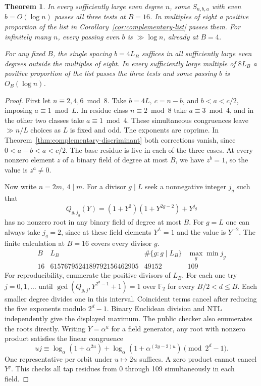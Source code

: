 \documentclass[11pt]{article}
\newtheorem{theorem}{Theorem}
\newcommand{\F}{\mathbb F_2}
\begin{document}
\begin{theorem}\label{thm:complementary-local}
In every sufficiently large even degree \(n\), some \(S_{n,b,a}\)
with even \(b=O(\log n)\) passes all three tests at \(B=16\).
In multiples of eight a positive proportion of the list in
Corollary~\ref{cor:complementary-list} passes them.
For infinitely many \(n\), every passing even \(b\) is
\(\gg\log n\), already at \(B=4\).

For any fixed \(B\), the single spacing \(b=4L_B\) suffices in all
sufficiently large even degrees outside the multiples of eight.
In every sufficiently large multiple of \(8L_B\) a positive proportion
of the list passes the three tests and some passing \(b\) is \(O_B(\log n)\).
\end{theorem}
\begin{proof}
First let \(n\equiv2,4,6\bmod8\). Take \(b=4L,\ c=n-b\), and
\(b<a<c/2\), imposing \(a\equiv1\bmod L\). In residue class
\(n\equiv2\bmod8\) take \(a\equiv3\bmod4\), and in the other two
classes take \(a\equiv1\bmod4\). These simultaneous congruences
leave \(\gg n/L\) choices as \(L\) is fixed and odd. The exponents
are coprime. In Theorem~\ref{thm:complementary-discriminant} both
corrections vanish, since \(0<a-b<a<c/2\). The base residue is
five in each of the three cases. At every nonzero element \(z\) of
a binary field of degree at most \(B\), we have \(z^b=1\), so the
value is \(z^a\ne0\).

Now write \(n=2m,\ 4\mid m\). For a divisor \(g\mid L\) seek
a nonnegative integer \(j_g\) such that
\[
 Q_{g,j_g}(Y)=(1+Y^2)(1+Y^{2g-2})+Y^{j_g}
\]
has no nonzero root in any binary field of degree at most \(B\).
For \(g=L\) one can always take \(j_g=2\), since at these field elements
\(Y^L=1\) and the value is \(Y^{-2}\). The finite calculation at
\(B=16\) covers every divisor \(g\).
\[
 \begin{array}{r|r|r|r}
 B&L_B&\#\{g:g\mid L_B\}&\max_g\min j_g\\\hline
 16&6157679524189792156462905&49152&109
 \end{array}
\]
For reproducibility, enumerate the positive divisors of \(L_B\).
For each one try \(j=0,1,\ldots\) until
\(\gcd(Q_{g,j},Y^{2^d-1}+1)=1\) over \(\F\) for every
\(B/2<d\le B\). Each smaller degree divides one in this interval.
Coincident terms cancel after reducing the five exponents modulo
\(2^d-1\). Binary Euclidean division and NTL independently give the
displayed maximum. The public checker also enumerates the roots directly.
Writing \(Y=\alpha^u\) for a field generator, any root with nonzero
product satisfies the linear congruence
\[
 uj\equiv \log_\alpha(1+\alpha^{2u})+
          \log_\alpha(1+\alpha^{(2g-2)u})\pmod{2^d-1}.
\]
One representative per orbit under \(u\mapsto2u\) suffices. A zero
product cannot cancel \(Y^j\). This checks all tap residues from
0 through 109 simultaneously in each field.


\end{proof}
\end{document}
